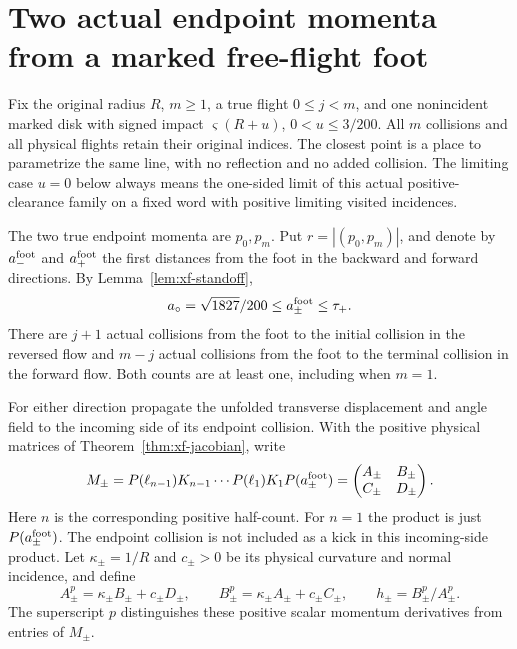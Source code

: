 \section{Two actual endpoint momenta from a marked free-flight foot}
\label{sec:bf-foot-split}

Fix the original radius $R$, $m\ge1$, a true flight $0\le j<m$,
and one nonincident marked disk with signed impact
$\varsigma(R+u)$, $0<u\le3/200$.  All $m$ collisions and all physical
flights retain their original indices.  The closest point is a place
to parametrize the same line, with no reflection and no added
collision.  The limiting case $u=0$ below always means the one-sided
limit of this actual positive-clearance family on a fixed word with
positive limiting visited incidences.

The two true endpoint momenta are $p_0,p_m$.  Put
$r=|(p_0,p_m)|$, and denote by $a_-^{\rm foot}$ and
$a_+^{\rm foot}$ the first distances from the foot in the backward and
forward directions.  By Lemma~\ref{lem:xf-standoff},
\[
 a_\circ=\sqrt{1827}/200\le a_\pm^{\rm foot}\le\tau_+.
\]
There are $j+1$ actual collisions from the foot to the initial
collision in the reversed flow and $m-j$ actual collisions from the
foot to the terminal collision in the forward flow.  Both counts
are at least one, including when $m=1$.

For either direction propagate the unfolded transverse displacement
and angle field to the incoming side of its endpoint collision.  With
the positive physical matrices of Theorem~\ref{thm:xf-jacobian}, write
\begin{equation}\label{eq:bf-half-product}
 M_\pm=P(\ell_{n-1})K_{n-1}\cdots P(\ell_1)K_1
                         P(a_\pm^{\rm foot})
       =\begin{pmatrix}A_\pm&B_\pm\\C_\pm&D_\pm\end{pmatrix}.
\end{equation}
Here $n$ is the corresponding positive half-count.  For $n=1$ the
product is just $P(a_\pm^{\rm foot})$.  The endpoint collision is
not included as a kick in this incoming-side product.  Let
$\kappa_\pm=1/R$ and $c_\pm>0$ be its physical curvature and normal
incidence, and define
\begin{equation}\label{eq:bf-ab}
 A_\pm^{p}=\kappa_\pm B_\pm+c_\pm D_\pm,\qquad
 B_\pm^{p}=\kappa_\pm A_\pm+c_\pm C_\pm,\qquad
 h_\pm=B_\pm^{p}/A_\pm^{p}.
\end{equation}
The superscript $p$ distinguishes these positive scalar momentum
derivatives from entries of $M_\pm$.

